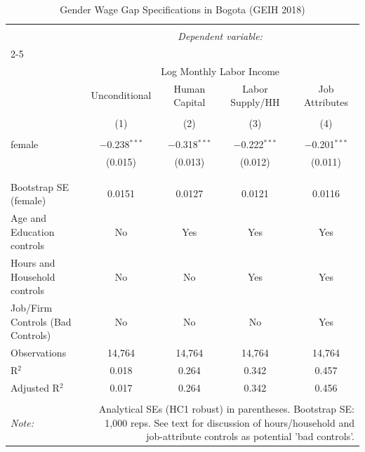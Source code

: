 
\begin{table}[!htbp] \centering 
  \caption{Gender Wage Gap Specifications in Bogota (GEIH 2018)} 
  \label{tab:gender_gap} 
\begin{tabular}{@{\extracolsep{5pt}}lcccc} 
\\[-1.8ex]\hline 
\hline \\[-1.8ex] 
 & \multicolumn{4}{c}{\textit{Dependent variable:}} \\ 
\cline{2-5} 
\\[-1.8ex] & \multicolumn{4}{c}{Log Monthly Labor Income} \\ 
 & Unconditional & Human Capital & Labor Supply/HH & Job Attributes \\ 
\\[-1.8ex] & (1) & (2) & (3) & (4)\\ 
\hline \\[-1.8ex] 
 female & $-$0.238$^{***}$ & $-$0.318$^{***}$ & $-$0.222$^{***}$ & $-$0.201$^{***}$ \\ 
  & (0.015) & (0.013) & (0.012) & (0.011) \\ 
  & & & & \\ 
\hline \\[-1.8ex] 
Bootstrap SE (female) & 0.0151 & 0.0127 & 0.0121 & 0.0116 \\ 
Age and Education controls & No & Yes & Yes & Yes \\ 
Hours and Household controls & No & No & Yes & Yes \\ 
Job/Firm Controls (Bad Controls) & No & No & No & Yes \\ 
Observations & 14,764 & 14,764 & 14,764 & 14,764 \\ 
R$^{2}$ & 0.018 & 0.264 & 0.342 & 0.457 \\ 
Adjusted R$^{2}$ & 0.017 & 0.264 & 0.342 & 0.456 \\ 
\hline 
\hline \\[-1.8ex] 
\textit{Note:}  & \multicolumn{4}{r}{Analytical SEs (HC1 robust) in parentheses. Bootstrap SE: 1,000 reps. See text for discussion of hours/household and job-attribute controls as potential 'bad controls'.} \\ 
\end{tabular} 
\end{table} 
